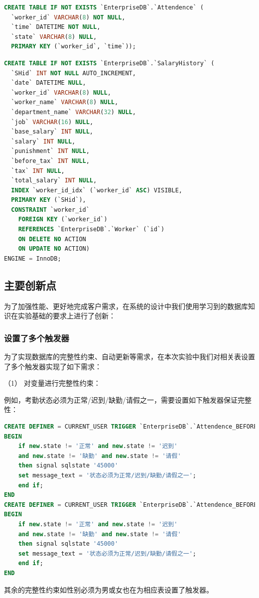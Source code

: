 \documentclass[withoutpreface,bwprint]{cumcmthesis} %
\newcommand{\kuohao}[1]{ \noindent （#1）}
\begin{document}
\begin{lstlisting}[language=SQL]
CREATE TABLE IF NOT EXISTS `EnterpriseDB`.`Attendence` (
  `worker_id` VARCHAR(8) NOT NULL,
  `time` DATETIME NOT NULL,
  `state` VARCHAR(8) NULL,
  PRIMARY KEY (`worker_id`, `time`));
\end{lstlisting}
\begin{lstlisting}[language=SQL]
CREATE TABLE IF NOT EXISTS `EnterpriseDB`.`SalaryHistory` (
  `SHid` INT NOT NULL AUTO_INCREMENT,
  `date` DATETIME NULL,
  `worker_id` VARCHAR(8) NULL,
  `worker_name` VARCHAR(8) NULL,
  `department_name` VARCHAR(32) NULL,
  `job` VARCHAR(16) NULL,
  `base_salary` INT NULL,
  `salary` INT NULL,
  `punishment` INT NULL,
  `before_tax` INT NULL,
  `tax` INT NULL,
  `total_salary` INT NULL,
  INDEX `worker_id_idx` (`worker_id` ASC) VISIBLE,
  PRIMARY KEY (`SHid`),
  CONSTRAINT `worker_id`
    FOREIGN KEY (`worker_id`)
    REFERENCES `EnterpriseDB`.`Worker` (`id`)
    ON DELETE NO ACTION
    ON UPDATE NO ACTION)
ENGINE = InnoDB;
\end{lstlisting}

\subsection{主要创新点}

为了加强性能、更好地完成客户需求，在系统的设计中我们使用学习到的数据库知识在实验基础的要求上进行了创新：


\subsubsection{设置了多个触发器}
为了实现数据库的完整性约束、自动更新等需求，在本次实验中我们对相关表设置了多个触发器实现了如下需求：

\kuohao{1} 对变量进行完整性约束：

例如，考勤状态必须为正常/迟到/缺勤/请假之一，需要设置如下触发器保证完整性：
\begin{lstlisting}[language=SQL]
CREATE DEFINER = CURRENT_USER TRIGGER `EnterpriseDB`.`Attendence_BEFORE_INSERT` BEFORE INSERT ON `Attendence` FOR EACH ROW
BEGIN
	if new.state != '正常' and new.state != '迟到' 
    and new.state != '缺勤' and new.state != '请假'
	then signal sqlstate '45000'
    set message_text = '状态必须为正常/迟到/缺勤/请假之一';
	end if;
END
CREATE DEFINER = CURRENT_USER TRIGGER `EnterpriseDB`.`Attendence_BEFORE_UPDATE` BEFORE UPDATE ON `Attendence` FOR EACH ROW
BEGIN
	if new.state != '正常' and new.state != '迟到' 
    and new.state != '缺勤' and new.state != '请假'
	then signal sqlstate '45000'
    set message_text = '状态必须为正常/迟到/缺勤/请假之一';
	end if;
END
\end{lstlisting}
其余的完整性约束如性别必须为男或女也在为相应表设置了触发器。
\end{document}
